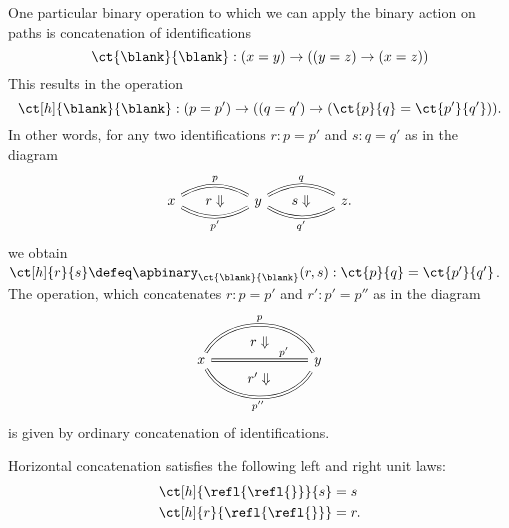\begin{eg}
  One particular binary operation to which we can apply the binary action on paths is concatenation of identifications
  \begin{equation*}
    \ct{\blank}{\blank}:(x=y)\to((y=z)\to (x=z))
  \end{equation*}
  This results in the  operation
  \begin{equation*}
    \ct[h]{\blank}{\blank} : (p=p')\to ((q=q') \to (\ct{p}{q}=\ct{p'}{q'})).
  \end{equation*}
  In other words, for any two identifications $r:p=p'$ and $s:q=q'$ as in the diagram
  \begin{equation*}
    \begin{tikzcd}[column sep=huge]
      x \arrow[r,equals,bend left=30,"p",""{name=A,below}] \arrow[r,equals,bend right=30,""{name=B,above},"{p'}"{below}] \arrow[from=A,to=B,phantom,"r\Downarrow"] & y \arrow[r,equals,bend left=30,"q",""{name=C,below}] \arrow[r,equals,bend right=30,""{name=D,above},"{q'}"{below}] \arrow[from=C,to=D,phantom,"s\Downarrow"] & z.
    \end{tikzcd}
  \end{equation*}
  we obtain $\ct[h]{r}{s}\defeq\apbinary_{\ct{\blank}{\blank}}(r,s):\ct{p}{q}=\ct{p'}{q'}$. The  operation, which concatenates $r:p=p'$ and $r':p'=p''$ as in the diagram
  \begin{equation*}
    \begin{tikzcd}[column sep=7em]
      x \arrow[r,equals,bend left=60,"p",""{name=A,below}] \arrow[r,equals,""{name=B},""{name=E,below},"{p'}"{near end}] \arrow[r,equals,bend right=60,"{p''}"{below},""{name=F,above}] \arrow[from=A,to=B,phantom,"r\Downarrow"] \arrow[from=E,to=F,phantom,"{r'\Downarrow}"] 
      & y
    \end{tikzcd}
  \end{equation*}
  is given by ordinary concatenation of identifications.
\end{eg}

\begin{lem}\label{lem:unit-laws-horizontal-concat}
  Horizontal concatenation satisfies the following left and right unit laws:
  \begin{align*}
    \ct[h]{\refl{\refl{}}}{s} & = s \\
    \ct[h]{r}{\refl{\refl{}}} & = r.
  \end{align*}
\end{lem}

